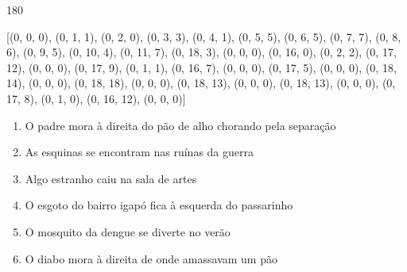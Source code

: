 \documentclass[12pt]{article}
\begin{document}
	\begin{turn}{180}	
		\begin{minipage}{\textwidth}[(0, 0, 0), (0, 1, 1), (0, 2, 0), (0, 3, 3), (0, 4, 1), (0, 5, 5), (0, 6, 5), (0, 7, 7), (0, 8, 6), (0, 9, 5), (0, 10, 4), (0, 11, 7), (0, 18, 3), (0, 0, 0), (0, 16, 0), (0, 2, 2), (0, 17, 12), (0, 0, 0), (0, 17, 9), (0, 1, 1), (0, 16, 7), (0, 0, 0), (0, 17, 5), (0, 0, 0), (0, 18, 14), (0, 0, 0), (0, 18, 18), (0, 0, 0), (0, 18, 13), (0, 0, 0), (0, 18, 13), (0, 0, 0), (0, 17, 8), (0, 1, 0), (0, 16, 12), (0, 0, 0)]	  
				
		\end{minipage}	
	\end{turn} 

\pagebreak
\sffamily
\large

	\begin{enumerate}


\vfill \item
O padre mora	%
à direita
do pão de alho chorando pela separação	%

\vfill \item
As esquinas se encontram	%
nas ruínas da guerra	%

\vfill \item
Algo estranho caiu	%
na sala de artes	%

\vfill \item
O esgoto do bairro igapó fica	%
à esquerda
do passarinho	%

\vfill \item
O mosquito da dengue se diverte	%
no verão	%

\vfill \item
O diabo mora	%
à direita
de onde amassavam um pão	%
	\end{enumerate}
\pagebreak
			\ttfamily %
\end{document}
